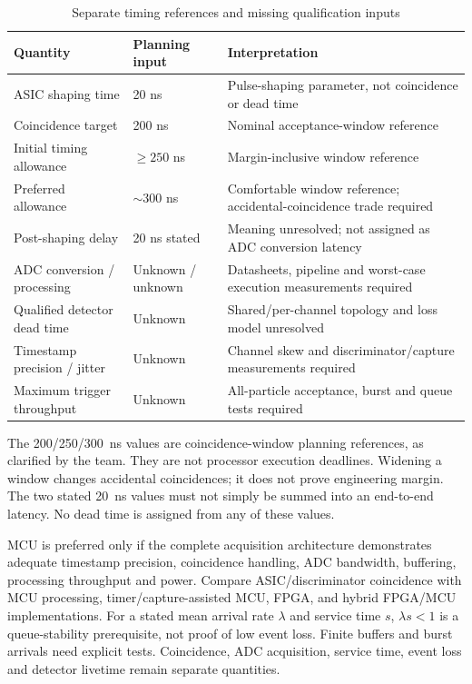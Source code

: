 \begin{table}[H]\centering\small
\caption{Separate timing references and missing qualification inputs}\label{tab:fpdu-timing}
\begin{tabularx}{\linewidth}{@{}p{4.2cm}p{2.4cm}X@{}}\toprule
Quantity & Planning input & Interpretation\\\midrule
ASIC shaping time & 20 ns & Pulse-shaping parameter, not coincidence or dead time\\
Coincidence target & 200 ns & Nominal acceptance-window reference\\
Initial timing allowance & $\geq250$ ns & Margin-inclusive window reference\\
Preferred allowance & $\sim300$ ns & Comfortable window reference; accidental-coincidence trade required\\
Post-shaping delay & 20 ns stated & Meaning unresolved; not assigned as ADC conversion latency\\
ADC conversion / processing & Unknown / unknown & Datasheets, pipeline and worst-case execution measurements required\\
Qualified detector dead time & Unknown & Shared/per-channel topology and loss model unresolved\\
Timestamp precision / jitter & Unknown & Channel skew and discriminator/capture measurements required\\
Maximum trigger throughput & Unknown & All-particle acceptance, burst and queue tests required\\\bottomrule
\end{tabularx}\end{table}

The 200/250/300~ns values are coincidence-window planning references, as clarified by the team. They are not processor execution deadlines. Widening a window changes accidental coincidences; it does not prove engineering margin. The two stated 20~ns values must not simply be summed into an end-to-end latency. No dead time is assigned from any of these values.

MCU is preferred only if the complete acquisition architecture demonstrates adequate timestamp precision, coincidence handling, ADC bandwidth, buffering, processing throughput and power. Compare ASIC/discriminator coincidence with MCU processing, timer/capture-assisted MCU, FPGA, and hybrid FPGA/MCU implementations. For a stated mean arrival rate $\lambda$ and service time $s$, $\lambda s<1$ is a queue-stability prerequisite, not proof of low event loss. Finite buffers and burst arrivals need explicit tests. Coincidence, ADC acquisition, service time, event loss and detector livetime remain separate quantities.
\FloatBarrier

